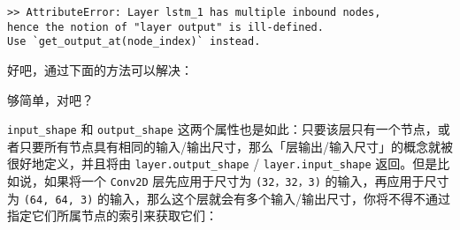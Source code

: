 \begin{verbatim}
>> AttributeError: Layer lstm_1 has multiple inbound nodes,
hence the notion of "layer output" is ill-defined.
Use `get_output_at(node_index)` instead.
\end{verbatim}

好吧，通过下面的方法可以解决：

\begin{Shaded}
\begin{Highlighting}[]
 \NormalTok{) }\OperatorTok{==} 
 \NormalTok{) }\OperatorTok{==} 
\end{Highlighting}
\end{Shaded}

够简单，对吧？

\texttt{input\_shape} 和 \texttt{output\_shape}
这两个属性也是如此：只要该层只有一个节点，或者只要所有节点具有相同的输入/输出尺寸，那么「层输出/输入尺寸」的概念就被很好地定义，并且将由
\texttt{layer.output\_shape} / \texttt{layer.input\_shape}
返回。但是比如说，如果将一个 \texttt{Conv2D} 层先应用于尺寸为
\texttt{(32，32，3)} 的输入，再应用于尺寸为 \texttt{(64,\ 64,\ 3)}
的输入，那么这个层就会有多个输入/输出尺寸，你将不得不通过指定它们所属节点的索引来获取它们：

\begin{Shaded}
\begin{Highlighting}[]
\OperatorTok{=} \OperatorTok{=}\NormalTok{(}\NormalTok{, }\NormalTok{, }\NormalTok{))}
\OperatorTok{=} \OperatorTok{=}\NormalTok{(}\NormalTok{, }\NormalTok{, }\NormalTok{))}

\OperatorTok{=} \NormalTok{, (}\NormalTok{, }\OperatorTok{=}\NormalTok{)}
\OperatorTok{=} 

 \OperatorTok{==} \NormalTok{(}\NormalTok{, }\NormalTok{, }\NormalTok{, }\NormalTok{)}

\OperatorTok{=} 
 \NormalTok{) }\OperatorTok{==} \NormalTok{(}\NormalTok{, }\NormalTok{, }\NormalTok{, }\NormalTok{)}
 \NormalTok{) }\OperatorTok{==} \NormalTok{(}\NormalTok{, }\NormalTok{, }\NormalTok{, }\NormalTok{)}
\end{Highlighting}
\end{Shaded}


